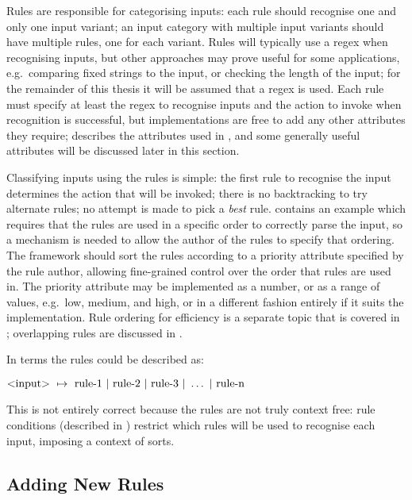 \label{rules in architecture}

Rules are responsible for categorising inputs: each rule should recognise
one and only one input variant; an input category with multiple input
variants should have multiple rules, one for each variant.  Rules will
typically use a regex when recognising inputs, but other approaches may
prove useful for some applications, e.g.\ comparing fixed strings to the
input, or checking the length of the input; for the remainder of this
thesis it will be assumed that a regex is used.  Each rule must specify at
least the regex to recognise inputs and the action to invoke when
recognition is successful, but implementations are free to add any other
attributes they require;  describes the attributes
used in \parsername{}, and some generally useful attributes will be
discussed later in this section.

Classifying inputs using the rules is simple: the first
rule to recognise the input determines the action that will be invoked;
there is no backtracking to try alternate rules; no attempt is made to pick
a \textit{best\/} rule.  
contains an example which requires that the rules are used in a specific
order to correctly parse the input, so a mechanism is needed to allow the
author of the rules to specify that ordering.  The framework should sort
the rules according to a priority attribute specified by the rule author,
allowing fine-grained control over the order that rules are used in.  The
priority attribute may be implemented as a number, or as a range of values,
e.g.\ low, medium, and high, or in a different fashion entirely if it suits
the implementation.  Rule ordering for efficiency is a separate topic that
is covered in ; overlapping rules
are discussed in .

In  terms the rules could be described as:

$\text{\textless{}input\textgreater{}}~\mapsto{}~\text{rule-1}~|~\text{rule-2}~|~\text{rule-3}~|~\dots~|~\text{rule-n}$

This is not entirely correct because the rules are not truly context free:
rule conditions (described in )
restrict which rules will be used to recognise each input, imposing a
context of sorts.

\subsection{Adding New Rules}

